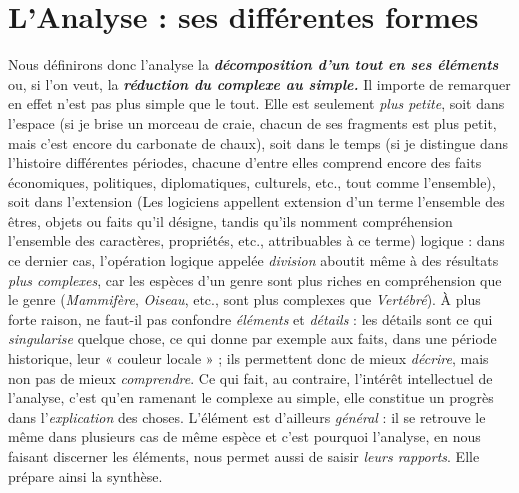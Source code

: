 \section{L’Analyse : ses différentes formes}%
Nous définirons donc
l'analyse la \textbf{\textit {décomposition d’un tout en ses éléments}} ou, si l’on veut,
la \textbf{\textit {réduction du complexe au simple.}} Il importe de remarquer en effet
n’est pas plus simple que le tout. Elle est seulement {\it plus petite}, soit
dans l’espace (si je brise un morceau de craie, chacun de ses fragments
est plus petit, mais c’est encore du carbonate de chaux), soit dans
le temps (si je distingue dans l’histoire différentes périodes, chacune
d’entre elles comprend encore des faits économiques, politiques, diplomatiques,
culturels, etc., tout comme l’ensemble), soit dans l’extension
{\footnotesize (Les logiciens appellent extension d'un terme l’ensemble des êtres, objets ou faits
qu'il désigne, tandis qu'ils nomment compréhension l'ensemble des caractères, propriétés,
etc., attribuables à ce terme)}
logique : dans ce dernier cas, l’opération logique appelée {\it division}
aboutit même à des résultats {\it plus complexes}, car les espèces
d’un genre sont plus riches en compréhension que le genre ({\it Mammifère},
{\it Oiseau}, etc., sont plus complexes que {\it Vertébré}). À plus forte raison,
ne faut-il pas confondre {\it éléments} et {\it détails} : les détails sont ce qui
{\it singularise} quelque chose, ce qui donne par exemple aux faits, dans
une période historique, leur « couleur locale » ; ils permettent donc
de mieux {\it décrire}, mais non pas de mieux {\it comprendre}. Ce qui fait,
au contraire, l'intérêt intellectuel de l'analyse, c’est qu’en ramenant
le complexe au simple, elle constitue un progrès dans l'{\it explication}
des choses. L’élément est d’ailleurs {\it général} : il se retrouve le même
dans plusieurs cas de même espèce et c’est pourquoi l’analyse, en nous
faisant discerner les éléments, nous permet aussi de saisir {\it leurs
rapports}. Elle prépare ainsi la synthèse.

